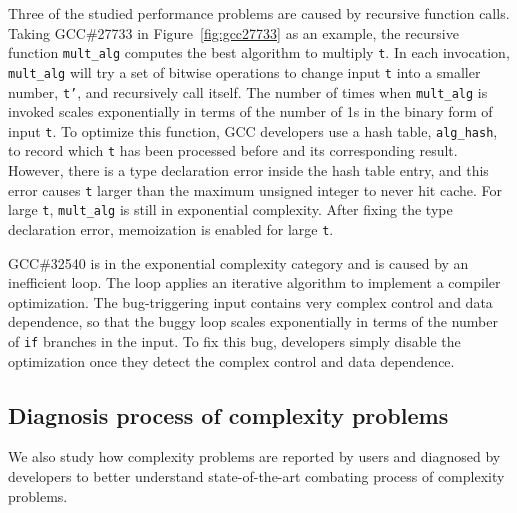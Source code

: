 Three of the studied performance problems are caused by recursive function calls. 
Taking GCC\#27733 in Figure~\ref{fig:gcc27733} as an example, 
the recursive function \texttt{mult\_alg} computes the best algorithm to multiply \texttt{t}.
In each invocation, \texttt{mult\_alg} will try a set of bitwise 
operations to change input 
\texttt{t} into a smaller number, \texttt{t'}, 
and recursively call itself.
The number of times when \texttt{mult\_alg} is invoked scales exponentially 
in terms of the number of 1s in the binary form of input \texttt{t}.
To optimize this function, 
GCC developers use a hash table, \texttt{alg\_hash}, to record
which \texttt{t} has been processed before and its corresponding result.
However, there is a type declaration error inside the hash table entry,
and this error causes \texttt{t} larger than the maximum unsigned integer to never hit cache.
For large \texttt{t}, \texttt{mult\_alg} is still in exponential complexity. 
After fixing the type declaration error, 
memoization is enabled for large \texttt{t}. 

GCC\#32540 is in the exponential complexity category and is caused by an inefficient loop. 
The loop applies an iterative algorithm to implement a compiler optimization. 
The bug-triggering input contains very complex control and data dependence,  
so that the buggy loop scales exponentially in terms of the number 
of \texttt{if} branches in the input. 
To fix this bug, developers simply disable the optimization 
once they detect the complex control and data dependence.  


\subsection{Diagnosis process of complexity problems}
\label{sec:process}

We also study how complexity problems are reported by users and diagnosed by developers 
to better understand state-of-the-art combating process of complexity problems. 


